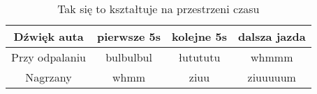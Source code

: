 \begin{table}[htbp]
\centering
\begin{tabular}{|c| c c c|} 
    \hline
    Dźwięk auta & pierwsze 5s & kolejne 5s & dalsza jazda \\  
    \hline
    Przy odpalaniu & bulbulbul & łutututu & whmmm \\ 
    \hline
    Nagrzany & whmm & ziuu & ziuuuuum \\
    \hline
\end{tabular}
\label{tab:sounds_of_motor}
\caption{Tak się to kształtuje na przestrzeni czasu}
\end{table}